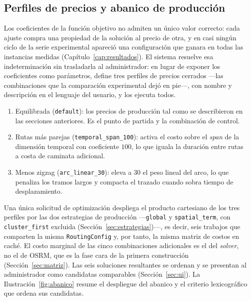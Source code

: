 \subsection{Perfiles de precios y abanico de producción}
\label{sec:abanico}

Los coeficientes de la función objetivo no admiten un único valor correcto: cada ajuste compra una
propiedad de la solución al precio de otra, y en casi ningún ciclo de la serie experimental
apareció una configuración que ganara en todas las instancias medidas
(Capítulo~\ref{cap:resultados}). El sistema resuelve esa indeterminación sin trasladarla al
administrador: en lugar de exponer los coeficientes como parámetros, define tres perfiles de
precios cerrados ---las combinaciones que la comparación experimental dejó en pie---, con nombre y
descripción en el lenguaje del usuario, y los ejecuta todos.

\begin{enumerate}
  \item Equilibrada (\texttt{default}): los precios de producción tal como se describieron en las
        secciones anteriores. Es el punto de partida y la combinación de control.
  \item Rutas más parejas (\texttt{temporal\_span\_100}): activa el costo sobre el \textit{span} de
        la dimensión temporal con coeficiente $100$, lo que iguala la duración entre rutas a costa
        de caminata adicional.
  \item Menos zigzag (\texttt{arc\_linear\_30}): eleva a $30$ el peso lineal del arco, lo que
        penaliza los tramos largos y compacta el trazado cuando sobra tiempo de desplazamiento.
\end{enumerate}

Una única solicitud de optimización despliega el producto cartesiano de los tres perfiles por las
dos estrategias de producción ---\texttt{global} y \texttt{spatial\_term}, con
\texttt{cluster\_first} excluida (Sección~\ref{sec:estrategias})---, es decir, seis trabajos que
comparten la misma \texttt{RoutingConfig} y, por tanto, la misma matriz de costos en caché. El costo
marginal de las cinco combinaciones adicionales es el del \textit{solver}, no el de OSRM, que es la
fase cara de la primera construcción (Sección~\ref{sec:matriz}). Las seis soluciones resultantes se
ordenan y se presentan al administrador como candidatas comparables (Sección~\ref{sec:ui}). La
Ilustración~\ref{fig:abanico} resume el despliegue del abanico y el criterio lexicográfico que
ordena sus candidatas.

